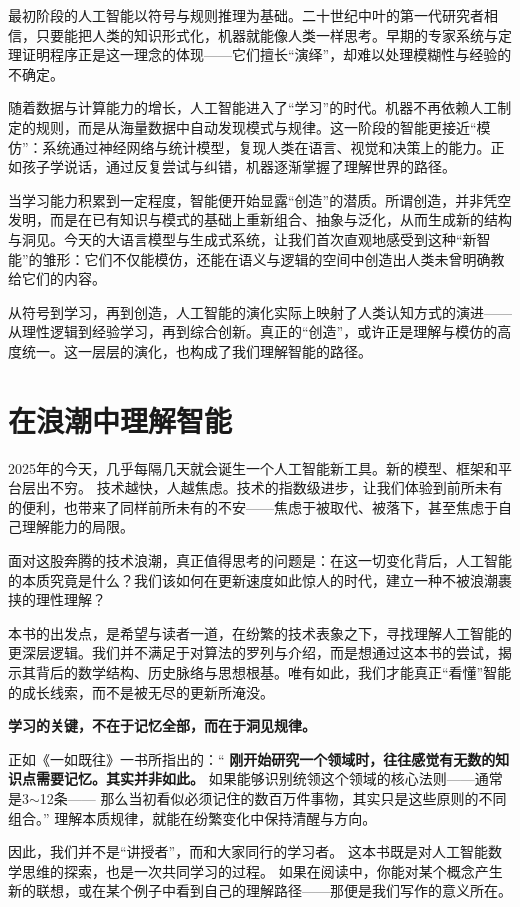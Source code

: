 最初阶段的人工智能以符号与规则推理为基础。二十世纪中叶的第一代研究者相信，只要能把人类的知识形式化，机器就能像人类一样思考。早期的专家系统与定理证明程序正是这一理念的体现——它们擅长“演绎”，却难以处理模糊性与经验的不确定。

随着数据与计算能力的增长，人工智能进入了“学习”的时代。机器不再依赖人工制定的规则，而是从海量数据中自动发现模式与规律。这一阶段的智能更接近“模仿”：系统通过神经网络与统计模型，复现人类在语言、视觉和决策上的能力。正如孩子学说话，通过反复尝试与纠错，机器逐渐掌握了理解世界的路径。

当学习能力积累到一定程度，智能便开始显露“创造”的潜质。所谓创造，并非凭空发明，而是在已有知识与模式的基础上重新组合、抽象与泛化，从而生成新的结构与洞见。今天的大语言模型与生成式系统，让我们首次直观地感受到这种“新智能”的雏形：它们不仅能模仿，还能在语义与逻辑的空间中创造出人类未曾明确教给它们的内容。

从符号到学习，再到创造，人工智能的演化实际上映射了人类认知方式的演进——从理性逻辑到经验学习，再到综合创新。真正的“创造”，或许正是理解与模仿的高度统一。这一层层的演化，也构成了我们理解智能的路径。

\section{在浪潮中理解智能}
2025年的今天，几乎每隔几天就会诞生一个人工智能新工具。新的模型、框架和平台层出不穷。
技术越快，人越焦虑。技术的指数级进步，让我们体验到前所未有的便利，也带来了同样前所未有的不安——焦虑于被取代、被落下，甚至焦虑于自己理解能力的局限。  

面对这股奔腾的技术浪潮，真正值得思考的问题是：在这一切变化背后，人工智能的本质究竟是什么？我们该如何在更新速度如此惊人的时代，建立一种不被浪潮裹挟的理性理解？  

本书的出发点，是希望与读者一道，在纷繁的技术表象之下，寻找理解人工智能的更深层逻辑。我们并不满足于对算法的罗列与介绍，而是想通过这本书的尝试，揭示其背后的数学结构、历史脉络与思想根基。唯有如此，我们才能真正“看懂”智能的成长线索，而不是被无尽的更新所淹没。  

{\bf 学习的关键，不在于记忆全部，而在于洞见规律。}

正如《一如既往》一书所指出的：“
{\bf 刚开始研究一个领域时，往往感觉有无数的知识点需要记忆。其实并非如此。}
如果能够识别统领这个领域的核心法则——通常是3$\sim$12条——
那么当初看似必须记住的数百万件事物，其实只是这些原则的不同组合。”
理解本质规律，就能在纷繁变化中保持清醒与方向。  

因此，我们并不是“讲授者”，而和大家同行的学习者。  
这本书既是对人工智能数学思维的探索，也是一次共同学习的过程。  
如果在阅读中，你能对某个概念产生新的联想，或在某个例子中看到自己的理解路径——那便是我们写作的意义所在。  

